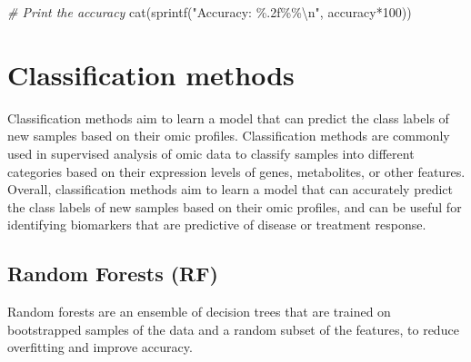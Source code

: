 \documentclass[
]{book}
\newenvironment{Shaded}{\begin{snugshade}}{\end{snugshade}}
\newcommand{\CommentTok}[1]{\textcolor[rgb]{0.56,0.35,0.01}{\textit{#1}}}
\newcommand{\DecValTok}[1]{\textcolor[rgb]{0.00,0.00,0.81}{#1}}
\newcommand{\FunctionTok}[1]{\textcolor[rgb]{0.00,0.00,0.00}{#1}}
\newcommand{\NormalTok}[1]{#1}
\newcommand{\SpecialCharTok}[1]{\textcolor[rgb]{0.00,0.00,0.00}{#1}}
\newcommand{\StringTok}[1]{\textcolor[rgb]{0.31,0.60,0.02}{#1}}
\begin{document}
\begin{Shaded}
\begin{Highlighting}[]
\CommentTok{\# Print the accuracy}
\FunctionTok{cat}\NormalTok{(}\FunctionTok{sprintf}\NormalTok{(}\StringTok{"Accuracy: \%.2f\%\%}\SpecialCharTok{\textbackslash{}n}\StringTok{"}\NormalTok{, accuracy}\SpecialCharTok{*}\DecValTok{100}\NormalTok{))}
\end{Highlighting}
\end{Shaded}

\normalsize

\hypertarget{classification-methods}{%
\section{Classification methods}\label{classification-methods}}

Classification methods aim to learn a model that can predict the class labels of new samples based on their omic profiles. Classification methods are commonly used in supervised analysis of omic data to classify samples into different categories based on their expression levels of genes, metabolites, or other features. Overall, classification methods aim to learn a model that can accurately predict the class labels of new samples based on their omic profiles, and can be useful for identifying biomarkers that are predictive of disease or treatment response.

\hypertarget{random-forests}{%
\subsection{Random Forests (RF)}\label{random-forests}}

Random forests are an ensemble of decision trees that are trained on bootstrapped samples of the data and a random subset of the features, to reduce overfitting and improve accuracy.

\small
\end{document}
